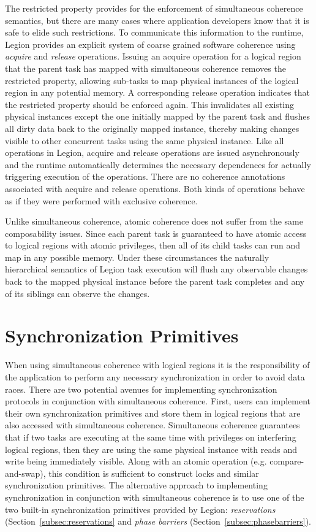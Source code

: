 The restricted property provides for the enforcement
of simultaneous coherence semantics, but there are
many cases where application developers know that it
is safe to elide such restrictions. To communicate 
this information to the runtime, Legion provides an
explicit system of coarse grained software coherence
using {\em acquire} and {\em release} operations.
Issuing an acquire operation for a logical region that 
the parent task has mapped with simultaneous coherence
removes the restricted property, allowing sub-tasks
to map physical instances of the logical region in any 
potential memory. A corresponding release operation 
indicates that the restricted property should be enforced 
again. This invalidates all existing physical instances 
except the one initially mapped by the parent task and 
flushes all dirty data back to the originally mapped instance,
thereby making changes visible to other concurrent
tasks using the same physical instance. Like all 
operations in Legion, acquire and release operations
are issued asynchronously and the runtime automatically
determines the necessary dependences for actually
triggering execution of the operations. There are no
coherence annotations associated with acquire and 
release operations. Both kinds of operations behave
as if they were performed with exclusive coherence.

Unlike simultaneous coherence, atomic coherence does
not suffer from the same composability issues. Since
each parent task is guaranteed to have atomic access to
logical regions with atomic privileges, then all of
its child tasks can run and map in any possible memory.
Under these circumstances the naturally hierarchical
semantics of Legion task execution will flush any 
observable changes back to the mapped physical instance 
before the parent task completes and any of its
siblings can observe the changes.

\section{Synchronization Primitives}
\label{sec:syncprimitives}
When using simultaneous coherence with logical regions
it is the responsibility of the application to perform
any necessary synchronization in order to avoid data
races. There are two potential avenues for implementing
synchronization protocols in conjunction with simultaneous
coherence. First, users can implement their own
synchronization primitives and store them in logical regions
that are also accessed with simultaneous coherence. 
Simultaneous coherence guarantees that if two tasks are 
executing at the same time with privileges on interfering
logical regions, then they are using the same physical 
instance with reads and write being immediately visible.
Along with an atomic operation (e.g. compare-and-swap), 
this condition is sufficient to construct locks and similar
synchronization primitives. The alternative approach to
implementing synchronization in conjunction with simultaneous 
coherence is to use one of the two built-in synchronization
primitives provided by Legion: {\em reservations} 
(Section~\ref{subsec:reservations} and
{\em phase barriers} (Section~\ref{subsec:phasebarriers}).

